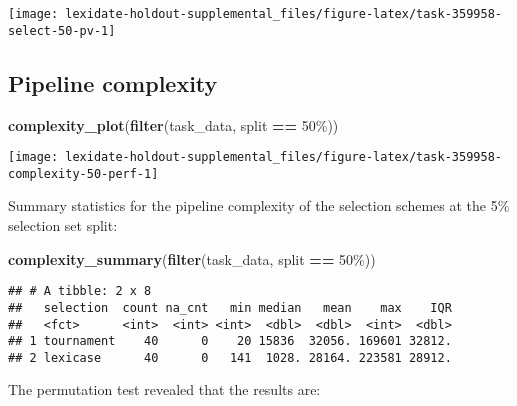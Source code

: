 \documentclass[
]{book}
\newenvironment{Shaded}{\begin{snugshade}}{\end{snugshade}}
\newcommand{\FunctionTok}[1]{\textcolor[rgb]{0.13,0.29,0.53}{\textbf{#1}}}
\newcommand{\NormalTok}[1]{#1}
\newcommand{\SpecialCharTok}[1]{\textcolor[rgb]{0.81,0.36,0.00}{\textbf{#1}}}
\newcommand{\StringTok}[1]{\textcolor[rgb]{0.31,0.60,0.02}{#1}}
\begin{document}
\texttt{[image: lexidate-holdout-supplemental\_files/figure-latex/task-359958-select-50-pv-1]}

\hypertarget{pipeline-complexity-31}{%
\subsection{Pipeline complexity}\label{pipeline-complexity-31}}

\begin{Shaded}
\begin{Highlighting}[]
\FunctionTok{complexity\_plot}\NormalTok{(}\FunctionTok{filter}\NormalTok{(task\_data, split }\SpecialCharTok{==} \StringTok{\textquotesingle{}50\%\textquotesingle{}}\NormalTok{))}
\end{Highlighting}
\end{Shaded}

\texttt{[image: lexidate-holdout-supplemental\_files/figure-latex/task-359958-complexity-50-perf-1]}

Summary statistics for the pipeline complexity of the selection schemes at the 5\% selection set split:

\begin{Shaded}
\begin{Highlighting}[]
\FunctionTok{complexity\_summary}\NormalTok{(}\FunctionTok{filter}\NormalTok{(task\_data, split }\SpecialCharTok{==} \StringTok{\textquotesingle{}50\%\textquotesingle{}}\NormalTok{))}
\end{Highlighting}
\end{Shaded}

\begin{verbatim}
## # A tibble: 2 x 8
##   selection  count na_cnt   min median   mean    max    IQR
##   <fct>      <int>  <int> <int>  <dbl>  <dbl>  <int>  <dbl>
## 1 tournament    40      0    20 15836  32056. 169601 32812.
## 2 lexicase      40      0   141  1028. 28164. 223581 28912.
\end{verbatim}

The permutation test revealed that the results are:
\end{document}
